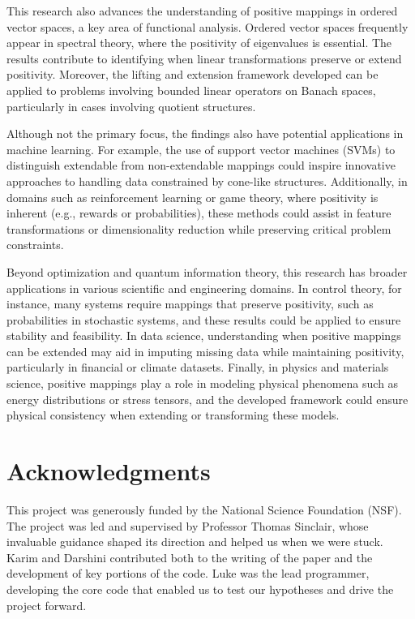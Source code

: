 \documentclass[11pt]{amsart}
\theoremstyle{definition}
\begin{document}
This research also advances the understanding of positive mappings in ordered vector spaces, a key area of functional analysis. Ordered vector spaces frequently appear in spectral theory, where the positivity of eigenvalues is essential. The results contribute to identifying when linear transformations preserve or extend positivity. Moreover, the lifting and extension framework developed can be applied to problems involving bounded linear operators on Banach spaces, particularly in cases involving quotient structures.

Although not the primary focus, the findings also have potential applications in machine learning. For example, the use of support vector machines (SVMs) to distinguish extendable from non-extendable mappings could inspire innovative approaches to handling data constrained by cone-like structures. Additionally, in domains such as reinforcement learning or game theory, where positivity is inherent (e.g., rewards or probabilities), these methods could assist in feature transformations or dimensionality reduction while preserving critical problem constraints.

Beyond optimization and quantum information theory, this research has broader applications in various scientific and engineering domains. In control theory, for instance, many systems require mappings that preserve positivity, such as probabilities in stochastic systems, and these results could be applied to ensure stability and feasibility. In data science, understanding when positive mappings can be extended may aid in imputing missing data while maintaining positivity, particularly in financial or climate datasets. Finally, in physics and materials science, positive mappings play a role in modeling physical phenomena such as energy distributions or stress tensors, and the developed framework could ensure physical consistency when extending or transforming these models.



\section{Acknowledgments}

This project was generously funded by the National Science Foundation (NSF). The project was led and supervised by Professor Thomas Sinclair, whose invaluable guidance shaped its direction and helped us when we were stuck. Karim and Darshini contributed both to the writing of the paper and the development of key portions of the code. Luke was the lead programmer, developing the core code that enabled us to test our hypotheses and drive the project forward.
\end{document}
